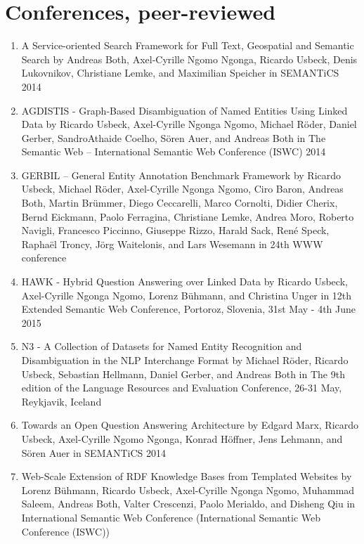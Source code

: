 \section*{Conferences, peer-reviewed}
\begin{enumerate}
    \item A Service-oriented Search Framework for Full Text, Geospatial and Semantic Search by Andreas Both, Axel-Cyrille Ngomo Ngonga, Ricardo Usbeck, Denis Lukovnikov, Christiane Lemke, and Maximilian Speicher in SEMANTiCS 2014 
    \item AGDISTIS - Graph-Based Disambiguation of Named Entities Using Linked Data by Ricardo Usbeck, Axel-Cyrille Ngonga Ngomo, Michael Röder, Daniel Gerber, SandroAthaide Coelho, Sören Auer, and Andreas Both in The Semantic Web -- International Semantic Web Conference (ISWC) 2014 
    \item GERBIL -- General Entity Annotation Benchmark Framework by Ricardo Usbeck, Michael Röder, Axel-Cyrille Ngonga Ngomo, Ciro Baron, Andreas Both, Martin Brümmer, Diego Ceccarelli, Marco Cornolti, Didier Cherix, Bernd Eickmann, Paolo Ferragina, Christiane Lemke, Andrea Moro, Roberto Navigli, Francesco Piccinno, Giuseppe Rizzo, Harald Sack, René Speck, Raphaël Troncy, Jörg Waitelonis, and Lars Wesemann in 24th WWW conference 
    \item HAWK - Hybrid Question Answering over Linked Data by Ricardo Usbeck, Axel-Cyrille Ngonga Ngomo, Lorenz Bühmann, and Christina Unger in 12th Extended Semantic Web Conference, Portoroz, Slovenia, 31st May - 4th June 2015 
    \item N3 - A Collection of Datasets for Named Entity Recognition and Disambiguation in the NLP Interchange Format by Michael Röder, Ricardo Usbeck, Sebastian Hellmann, Daniel Gerber, and Andreas Both in The 9th edition of the Language Resources and Evaluation Conference, 26-31 May, Reykjavik, Iceland 
    \item Towards an Open Question Answering Architecture by Edgard Marx, Ricardo Usbeck, Axel-Cyrille Ngomo Ngonga, Konrad Höffner, Jens Lehmann, and Sören Auer in SEMANTiCS 2014 
    \item Web-Scale Extension of RDF Knowledge Bases from Templated Websites by Lorenz Bühmann, Ricardo Usbeck, Axel-Cyrille Ngonga Ngomo, Muhammad Saleem, Andreas Both, Valter Crescenzi, Paolo Merialdo, and Disheng Qiu in International Semantic Web Conference (International Semantic Web Conference (ISWC)) 
\end{enumerate}


